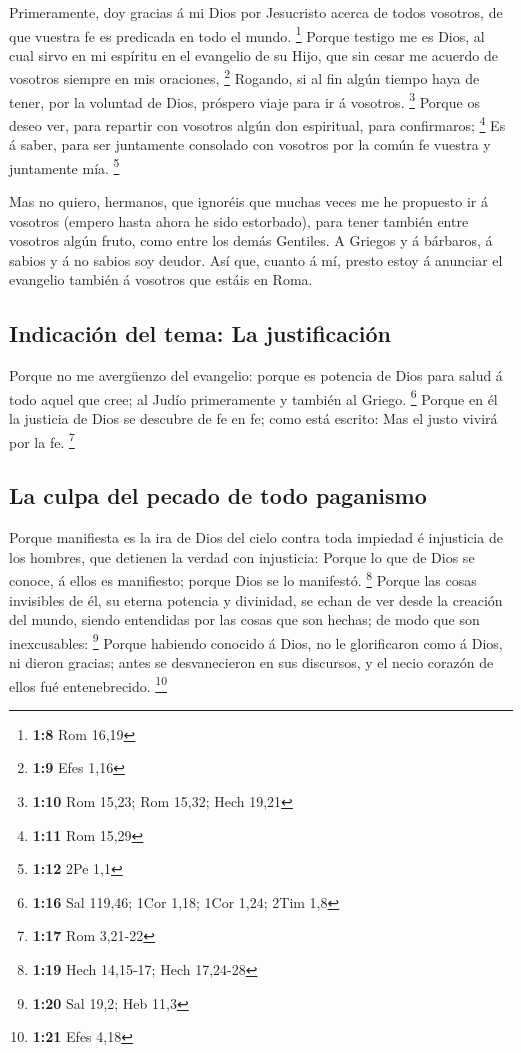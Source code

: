 Primeramente, doy gracias á mi Dios por Jesucristo acerca
de todos vosotros, de que vuestra fe es predicada en todo el mundo.
\footnote{\textbf{1:8} Rom 16,19}  Porque testigo me es
Dios, al cual sirvo en mi espíritu en el evangelio de su Hijo, que sin
cesar me acuerdo de vosotros siempre en mis oraciones, \footnote{\textbf{1:9}
  Efes 1,16}  Rogando, si al fin algún tiempo haya de
tener, por la voluntad de Dios, próspero viaje para ir á vosotros.
\footnote{\textbf{1:10} Rom 15,23; Rom 15,32; Hech 19,21} 
Porque os deseo ver, para repartir con vosotros algún don espiritual,
para confirmaros; \footnote{\textbf{1:11} Rom 15,29}  Es á
saber, para ser juntamente consolado con vosotros por la común fe
vuestra y juntamente mía. \footnote{\textbf{1:12} 2Pe 1,1}

 Mas no quiero, hermanos, que ignoréis que muchas veces me
he propuesto ir á vosotros (empero hasta ahora he sido estorbado), para
tener también entre vosotros algún fruto, como entre los demás Gentiles.
 A Griegos y á bárbaros, á sabios y á no sabios soy deudor.
 Así que, cuanto á mí, presto estoy á anunciar el evangelio
también á vosotros que estáis en Roma.

\hypertarget{indicaciuxf3n-del-tema-la-justificaciuxf3n}{%
\subsection{Indicación del tema: La
justificación}\label{indicaciuxf3n-del-tema-la-justificaciuxf3n}}

 Porque no me avergüenzo del evangelio: porque es potencia
de Dios para salud á todo aquel que cree; al Judío primeramente y
también al Griego. \footnote{\textbf{1:16} Sal 119,46; 1Cor 1,18; 1Cor
  1,24; 2Tim 1,8}  Porque en él la justicia de Dios se
descubre de fe en fe; como está escrito: Mas el justo vivirá por la fe.
\footnote{\textbf{1:17} Rom 3,21-22}

\hypertarget{la-culpa-del-pecado-de-todo-paganismo}{%
\subsection{La culpa del pecado de todo
paganismo}\label{la-culpa-del-pecado-de-todo-paganismo}}

 Porque manifiesta es la ira de Dios del cielo contra toda
impiedad é injusticia de los hombres, que detienen la verdad con
injusticia:  Porque lo que de Dios se conoce, á ellos es
manifiesto; porque Dios se lo manifestó. \footnote{\textbf{1:19} Hech
  14,15-17; Hech 17,24-28}  Porque las cosas invisibles de
él, su eterna potencia y divinidad, se echan de ver desde la creación
del mundo, siendo entendidas por las cosas que son hechas; de modo que
son inexcusables: \footnote{\textbf{1:20} Sal 19,2; Heb 11,3}
 Porque habiendo conocido á Dios, no le glorificaron como á
Dios, ni dieron gracias; antes se desvanecieron en sus discursos, y el
necio corazón de ellos fué entenebrecido. \footnote{\textbf{1:21} Efes
  4,18}


